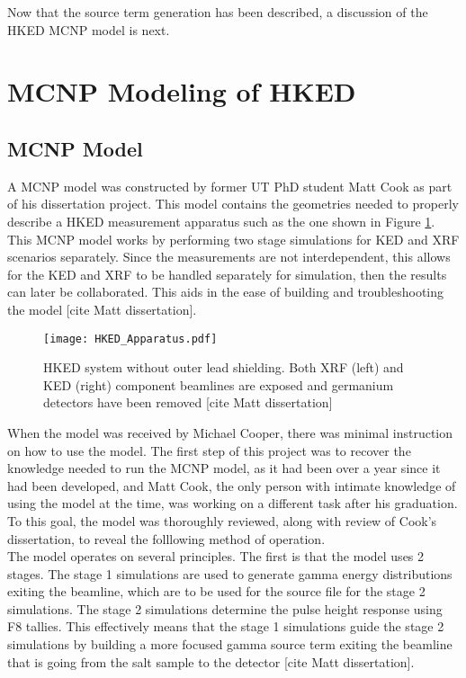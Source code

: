 Now that the source term generation has been described, a discussion of the HKED MCNP model is next. \\

\section{MCNP Modeling of HKED}

\subsection{MCNP Model}
A MCNP model was constructed by former UT PhD student Matt Cook as part of his dissertation project. This model contains the geometries needed to properly describe a HKED measurement apparatus such as the one shown in Figure \ref{HKED-apparatus}. This MCNP model works by performing two stage simulations for KED and XRF scenarios separately. Since the measurements are not interdependent, this allows for the KED and XRF to be handled separately for simulation, then the results can later be collaborated. This aids in the ease of building and troubleshooting the model [cite Matt dissertation]. \\


\begin{figure}[h]
  \centering
  \texttt{[image: HKED\_Apparatus.pdf]}\\
  \caption{HKED system without outer lead shielding. Both XRF (left) and KED (right) component beamlines are exposed and germanium detectors have been removed [cite Matt dissertation]}
 \label{HKED-apparatus}
\end{figure} 


When the model was received by Michael Cooper, there was minimal instruction on how to use the model.  The first step of this project was to recover the knowledge needed to run the MCNP model, as it had been over a year since it had been developed, and Matt Cook, the only person with intimate knowledge of using the model at the time, was working on a different task after his graduation. To this goal, the model was thoroughly reviewed, along with review of Cook's dissertation, to reveal the folllowing method of operation. \\

The model operates on several principles. The first is that the model uses 2 stages. The stage 1 simulations are used to generate gamma energy distributions exiting the beamline, which are to be used for the source file for the stage 2 simulations. The stage 2 simulations determine the pulse height response using F8 tallies. This effectively means that the stage 1 simulations guide the stage 2 simulations by building a more focused gamma source term  exiting the beamline that is going from the salt sample to the detector [cite Matt dissertation]. \\ %

